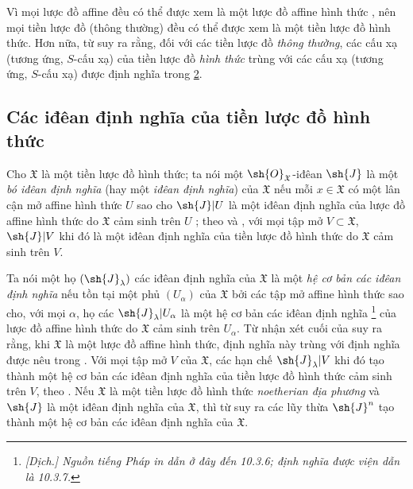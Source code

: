 \documentclass[oneside]{amsart}
\newcommand{\oldpage}[2][]{{\marginnote{\normalfont\textbf{#1}~|~#2}}\ignorespaces}
\let\EGAOriginalLabel\label
\renewcommand{\label}[1]{\phantomsection\EGAOriginalLabel{#1}}
\begin{document}
\begin{env}[10.4.8]
\label{I.10.4.8}
Vì mọi lược đồ affine đều có thể được xem là một lược đồ affine hình thức , nên mọi tiền lược đồ (thông thường) đều có thể được xem là một tiền lược đồ hình thức.
Hơn nữa, từ  suy ra rằng, đối với các tiền lược đồ \emph{thông thường}, các cấu xạ (tương ứng, $S$-cấu xạ) của tiền lược đồ \emph{hình thức} trùng với các cấu xạ (tương ứng, $S$-cấu xạ) được định nghĩa trong \textsection\hyperref[section:I.2]{2}.
\end{env}

\subsection{Các iđêan định nghĩa của tiền lược đồ hình thức}
\label{subsection:I.10.5}

\begin{env}[10.5.1]
\label{I.10.5.1}
Cho $\mathfrak{X}$ là một tiền lược đồ hình thức; ta nói một $\sh{O}_\mathfrak{X}$-iđêan $\sh{J}$ là một \emph{bó iđêan định nghĩa} (hay một \emph{iđêan định nghĩa}) của $\mathfrak{X}$ nếu mỗi $x\in\mathfrak{X}$ có một lân cận mở affine hình thức $U$ sao cho $\sh{J}|U$ là một iđêan định nghĩa của lược đồ affine hình thức do $\mathfrak{X}$ cảm sinh trên $U$ ; theo  và , với mọi tập mở $V\subset\mathfrak{X}$, $\sh{J}|V$ khi đó là một iđêan định nghĩa của tiền lược đồ hình thức do $\mathfrak{X}$ cảm sinh trên $V$.

Ta nói một họ $(\sh{J}_\lambda)$ các iđêan định nghĩa của $\mathfrak{X}$ là một \emph{hệ cơ bản}
\oldpage[I]{187}
\emph{các iđêan định nghĩa} nếu tồn tại một phủ $(U_\alpha)$ của $\mathfrak{X}$ bởi các tập mở affine hình thức sao cho, với mọi $\alpha$, họ các $\sh{J}_\lambda|U_\alpha$ là một hệ cơ bản các iđêan định nghĩa \footnote{\emph{[Dịch.] Nguồn tiếng Pháp in dẫn ở đây đến 10.3.6; định nghĩa được viện dẫn là 10.3.7.}} của lược đồ affine hình thức do $\mathfrak{X}$ cảm sinh trên $U_\alpha$.
Từ nhận xét cuối của  suy ra rằng, khi $\mathfrak{X}$ là một lược đồ affine hình thức, định nghĩa này trùng với định nghĩa được nêu trong .
Với mọi tập mở $V$ của $\mathfrak{X}$, các hạn chế $\sh{J}_\lambda|V$ khi đó tạo thành một hệ cơ bản các iđêan định nghĩa của tiền lược đồ hình thức cảm sinh trên $V$, theo .
Nếu $\mathfrak{X}$ là một tiền lược đồ hình thức \emph{noetherian địa phương} và $\sh{J}$ là một iđêan định nghĩa của $\mathfrak{X}$, thì từ  suy ra các lũy thừa $\sh{J}^n$ tạo thành một hệ cơ bản các iđêan định nghĩa của $\mathfrak{X}$.
\end{env}
\end{document}
